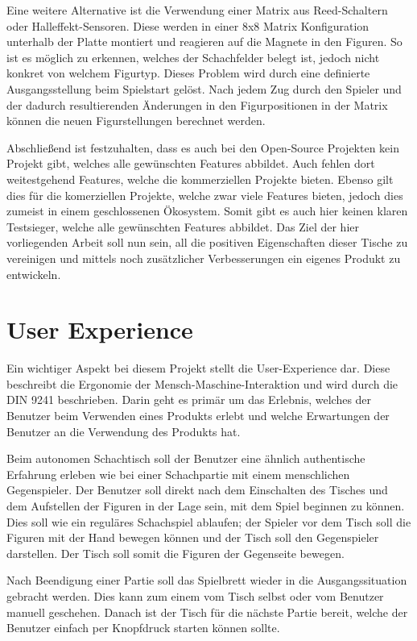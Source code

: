 Eine weitere Alternative ist die Verwendung einer Matrix aus
Reed-Schaltern oder Halleffekt-Sensoren. Diese werden in einer 8x8
Matrix Konfiguration unterhalb der Platte montiert und reagieren auf die
Magnete in den Figuren. So ist es möglich zu erkennen, welches der
Schachfelder belegt ist, jedoch nicht konkret von welchem Figurtyp.
Dieses Problem wird durch eine definierte Ausgangsstellung beim
Spielstart gelöst. Nach jedem Zug durch den Spieler und der dadurch
resultierenden Änderungen in den Figurpositionen in der Matrix können
die neuen Figurstellungen berechnet werden.

Abschließend ist festzuhalten, dass es auch bei den Open-Source
Projekten kein Projekt gibt, welches alle gewünschten Features abbildet.
Auch fehlen dort weitestgehend Features, welche die kommerziellen
Projekte bieten. Ebenso gilt dies für die komerziellen Projekte, welche
zwar viele Features bieten, jedoch dies zumeist in einem geschlossenen
Ökosystem. Somit gibt es auch hier keinen klaren Testsieger, welche alle
gewünschten Features abbildet. Das Ziel der hier vorliegenden Arbeit
soll nun sein, all die positiven Eigenschaften dieser Tische zu
vereinigen und mittels noch zusätzlicher Verbesserungen ein eigenes
Produkt zu entwickeln.

\hypertarget{user-experience}{%
\section{User Experience}\label{user-experience}}

Ein wichtiger Aspekt bei diesem Projekt stellt die User-Experience dar.
Diese beschreibt die Ergonomie der Mensch-Maschine-Interaktion und wird
durch die DIN 9241\cite{din9241} beschrieben. Darin geht es primär
um das Erlebnis, welches der Benutzer beim Verwenden eines Produkts
erlebt und welche Erwartungen der Benutzer an die Verwendung des
Produkts hat.

Beim autonomen Schachtisch soll der Benutzer eine ähnlich authentische
Erfahrung erleben wie bei einer Schachpartie mit einem menschlichen
Gegenspieler. Der Benutzer soll direkt nach dem Einschalten des Tisches
und dem Aufstellen der Figuren in der Lage sein, mit dem Spiel beginnen
zu können. Dies soll wie ein reguläres Schachspiel ablaufen; der Spieler
vor dem Tisch soll die Figuren mit der Hand bewegen können und der Tisch
soll den Gegenspieler darstellen. Der Tisch soll somit die Figuren der
Gegenseite bewegen.

Nach Beendigung einer Partie soll das Spielbrett wieder in die
Ausgangssituation gebracht werden. Dies kann zum einem vom Tisch selbst
oder vom Benutzer manuell geschehen. Danach ist der Tisch für die
nächste Partie bereit, welche der Benutzer einfach per Knopfdruck
starten können sollte.

